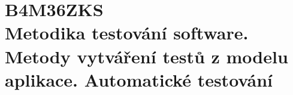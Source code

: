 \chapter[Zajištění kvality software]{B4M36ZKS \\[1ex]\Large{Metodika testování software. Metody vytváření testů z modelu aplikace. Automatické testování}}
